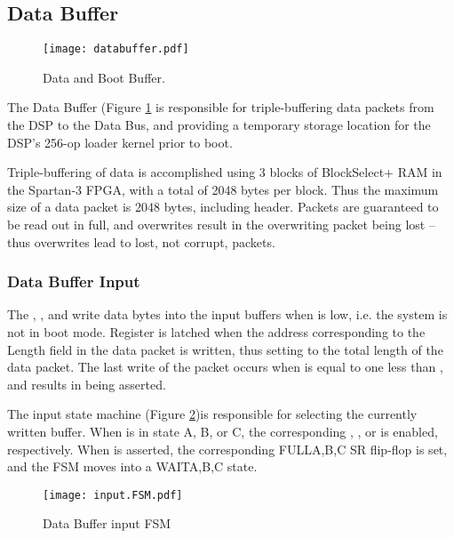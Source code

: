 
\subsection{Data Buffer}

\begin{figure}[h]
  \texttt{[image: databuffer.pdf]}
  \caption{Data and Boot Buffer.}
  \label{databuffer}
\end{figure}

The Data Buffer (Figure \ref{databuffer} is responsible for
triple-buffering data packets from the DSP to the Data Bus, and
providing a temporary storage location for the DSP's 256-op loader
kernel prior to boot.
    
Triple-buffering of data is accomplished using 3 blocks of
BlockSelect+ RAM in the Spartan-3 FPGA, with a total of 2048 bytes per
block. Thus the maximum size of a data packet is 2048 bytes, including
header. Packets are guaranteed to be read out in full, and overwrites
result in the overwriting packet being lost -- thus overwrites lead to
lost, not corrupt, packets.


\subsubsection{Data Buffer Input}
        
      
The , , and  write
data bytes into the input buffers when  is low, i.e. the
system is not in boot mode. Register  is latched
when the address corresponding to the Length field in the data packet
is written, thus setting  to the total length of
the data packet. The last write of the packet occurs when
 is equal to one less than ,
and results in  being asserted.

The input state machine  (Figure \ref{InputFSM})is
responsible for selecting the currently written buffer. When
 is in state A, B, or C, the corresponding
, , or  is enabled,
respectively. When  is asserted, the corresponding
FULL{A,B,C} SR flip-flop is set, and the FSM moves into a WAIT{A,B,C}
state.

      
\begin{figure}
  \texttt{[image: input.FSM.pdf]}
  \caption{Data Buffer input FSM}
  \label{InputFSM}
\end{figure}

